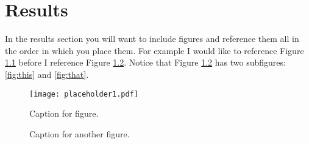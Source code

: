 \chapter{Results}

In the results section you will want to include figures and reference them all in the order in which you place them. For example I would like to reference Figure \ref{fig:something} before I reference Figure \ref{fig:somethingelse}. Notice that Figure \ref{fig:somethingelse} has two subfigures: \ref{fig:this} and \ref{fig:that}.

\begin{figure}[htbp]
\centering
\texttt{[image: placeholder1.pdf]}
\caption[Short caption for list of figures.]{Caption for figure.}
\label{fig:something}
\end{figure}


\begin{figure}[htbp]
\centering

\begin{subfigure}[this caption]{\label{fig:this}
\texttt{[image: placeholder1.pdf]}
}\end{subfigure}%
\begin{subfigure}[that caption]{\label{fig:that}
\texttt{[image: placeholder1.pdf]}
}\end{subfigure}

\caption[Another short caption for list of figures.]{Caption for another figure.}
\label{fig:somethingelse}
\end{figure}